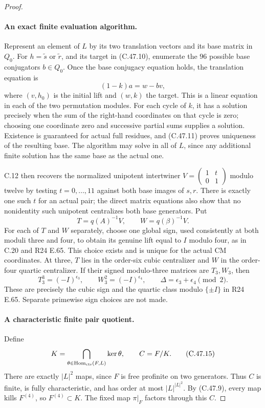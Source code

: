 \begin{proof}
\paragraph{An exact finite evaluation algorithm.}
Represent an element of $L$ by its two translation vectors and
its base matrix in $Q_0$. For $h=\widetilde s$ or
$\widetilde r$, and its target in (C.47.10), enumerate the
$96$ possible base conjugators $b\in Q_0$. Once the base
conjugacy equation holds, the translation equation is
\[
           (1-k)a=w-bv,                              \tag{C.47.12}
\]
where $(v,h_0)$ is the initial lift and $(w,k)$ the target.
This is a linear equation in each of the two permutation modules.
For each cycle of $k$, it has a solution precisely when the sum
of the right-hand coordinates on that cycle is zero; choosing one
coordinate zero and successive partial sums supplies a solution.
Existence is guaranteed for actual full residues, and (C.47.11)
proves uniqueness of the resulting base. The algorithm may solve
in all of $L$, since any additional finite solution has the same
base as the actual one.

C.12 then recovers the normalized unipotent intertwiner
$V=\left(\begin{smallmatrix}1&t\\0&1\end{smallmatrix}\right)$
modulo twelve by testing $t=0,\ldots,11$ against both base images
of $s,r$. There is exactly one such $t$ for an actual pair;
the direct matrix equations also show that no nonidentity such
unipotent centralizes both base generators. Put
\[
                      T=q(A)^{-1}V,\qquad
                      W=q(\beta)^{-1}V.             \tag{C.47.13}
\]
For each of $T$ and $W$ separately, choose one global sign,
used consistently at both moduli three and four, to obtain its
genuine lift equal to $I$ modulo four, as in C.20 and
R24 E.65. This choice exists and is unique for the actual CM
coordinates. At three, $T$ lies in the order-six cubic centralizer
and $W$ in the order-four quartic centralizer. If their signed
modulo-three matrices are $T_3,W_3$, then
\[
 T_3^3=(-I)^{\epsilon_3},\qquad
 W_3^2=(-I)^{\epsilon_4},\qquad
             \Delta=\epsilon_3+\epsilon_4\pmod2.     \tag{C.47.14}
\]
These are precisely the cubic sign and the quartic class modulo
$\{\pm I\}$ in R24 E.65. Separate primewise sign choices are
not made.

\paragraph{A characteristic finite pair quotient.}
Define
\[
 K=\bigcap_{\theta\in\operatorname{Hom}_{\rm cts}(F,L)}\ker\theta,
                       \qquad C=F/K.                \tag{C.47.15}
\]
There are exactly $|L|^2$ maps, since $F$ is free profinite on
two generators. Thus $C$ is finite, is fully characteristic,
and has order at most $|L|^{|L|^2}$. By (C.47.9), every map
kills $F^{(4)}$, so $F^{(4)}\subset K$. The fixed map
$\pi|_F$ factors through this $C$.


\end{proof}
